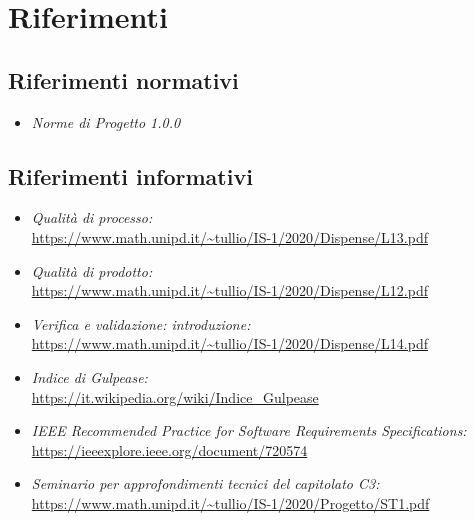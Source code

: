 \section{Riferimenti}\label{IntroduzioneRiferimenti}
\subsection{Riferimenti normativi}\label{IntroduzioneRiferimentiRiferimentiNormativi}
\begin{itemize}
	\item \textit{Norme di Progetto 1.0.0}
\end{itemize}
\subsection{Riferimenti informativi}\label{IntroduzioneRiferimentiRiferimentiInformativi}
\begin{itemize}
	\item \textit{Qualità di processo:}\\
	\url{https://www.math.unipd.it/~tullio/IS-1/2020/Dispense/L13.pdf}
	\item \textit{Qualità di prodotto:}\\
\url{https://www.math.unipd.it/~tullio/IS-1/2020/Dispense/L12.pdf}
	\item \textit{Verifica e validazione: introduzione:}\\
\url{https://www.math.unipd.it/~tullio/IS-1/2020/Dispense/L14.pdf}
\item \textit{Indice di Gulpease:}\\
\url{https://it.wikipedia.org/wiki/Indice_Gulpease}
	\item \textit{IEEE Recommended Practice for Software Requirements Specifications:}\\
	\url{https://ieeexplore.ieee.org/document/720574}
	\item \textit{Seminario per approfondimenti tecnici del capitolato C3:}\\
	\url{https://www.math.unipd.it/~tullio/IS-1/2020/Progetto/ST1.pdf}		
\end{itemize}